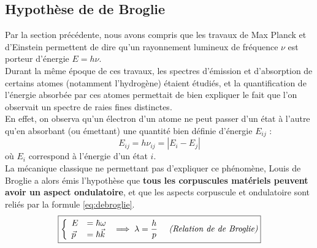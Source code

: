 \documentclass[../notesdecours]{subfiles}
\begin{document}
\subsection{Hypothèse de de Broglie}

Par la section précédente, nous avons compris que les travaux de Max Planck et d'Einstein permettent de dire qu'un rayonnement lumineux de fréquence $\nu$ est porteur d'énergie $E = h \nu$. \\
Durant la même époque de ces travaux, les spectres d'émission et d'absorption de certains atomes (notamment l'hydrogène) étaient étudiés, et la quantification de l'énergie absorbée par ces atomes permettait de bien expliquer le fait que l'on observait un spectre de raies fines distinctes. \\
En effet, on observa qu'un électron d'un atome ne peut passer d'un état à l'autre qu'en absorbant (ou émettant) une quantité bien définie d'énergie $E_{ij}$ : 
$$E_{ij} = h\nu_{ij} = |E_i - E_j|$$
où $E_i$ correspond à l'énergie d'un état $i$. \\

La mécanique classique ne permettant pas d'expliquer ce phénomène, Louis de Broglie a alors émis l'hypothèse 
que \textbf{tous les corpuscules matériels peuvent avoir un aspect ondulatoire}, et que les aspects corpuscule et ondulatoire sont reliés par la formule \eqref{eq:debroglie}.
\begin{equation} \label{eq:debroglie}
\boxed{
\left\{ \begin{array}{ll}
E &= \hbar \omega \\
\vec p &= \hbar \vec k
\end{array} \right. \implies \lambda = \frac{h}{p} \quad \text{ \textit{(Relation de de Broglie)}}} 
\end{equation}
\end{document}
